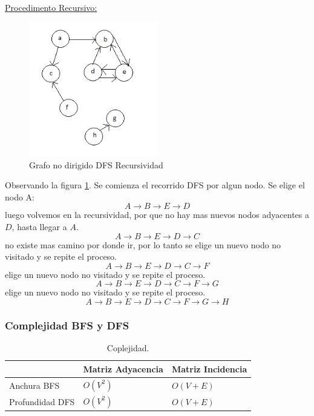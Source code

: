 \documentclass[../main.tex]{subfiles}
\begin{document}
            \underline{Procedimento Recursivo:}
            \begin{figure}[ht]
                \centering
                \includegraphics[width=0.5\textwidth]{images/grafos/grafo_dfs_recursividad.png}
                \caption{Grafo no dirigido DFS Recursividad}
                \label{fig:grafo_dfs_recursividad}
            \end{figure}
            
            Observando la figura \ref{fig:grafo_dfs_recursividad}. Se comienza el recorrido DFS por algun nodo. Se elige el nodo A:
            $$ A \rightarrow B \rightarrow E \rightarrow D $$ 
            luego volvemos en la recursividad, por que no hay mas nuevos nodos adyacentes a $D$, hasta llegar a $A$.
            $$ A \rightarrow B \rightarrow E \rightarrow D \rightarrow C $$ 
            no existe mas camino por donde ir, por lo tanto se elige un nuevo nodo no visitado y se repite el proceso.
            $$ A \rightarrow B \rightarrow E \rightarrow D \rightarrow C \rightarrow F $$
            elige un nuevo nodo no visitado y se repite el proceso.
            $$ A \rightarrow B \rightarrow E \rightarrow D \rightarrow C \rightarrow F \rightarrow G $$
            elige un nuevo nodo no visitado y se repite el proceso.
            $$ A \rightarrow B \rightarrow E \rightarrow D \rightarrow C \rightarrow F \rightarrow G \rightarrow H $$

        \subsubsection{Complejidad BFS y DFS}
                
            \begin{table}[ht]
                \centering
                \begin{tabular}{|l|l|l|}
                \hline
                & Matriz Adyacencia & Matriz Incidencia  \\ \hline
                Anchura BFS & $O(V^2)$ & $O(V+E)$ \\ \hline
                Profundidad DFS & $O(V^2)$ & $O(V+E)$  \\ \hline
                \end{tabular}
                \caption[short]{Coplejidad.}
                \label{tab:tabla_complejidad_bfs_dfs}
            \end{table}
\end{document}
